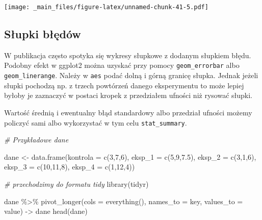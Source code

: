 \documentclass[
]{book}
\newenvironment{Shaded}{\begin{snugshade}}{\end{snugshade}}
\newcommand{\AttributeTok}[1]{\textcolor[rgb]{0.77,0.63,0.00}{#1}}
\newcommand{\CommentTok}[1]{\textcolor[rgb]{0.56,0.35,0.01}{\textit{#1}}}
\newcommand{\DecValTok}[1]{\textcolor[rgb]{0.00,0.00,0.81}{#1}}
\newcommand{\FloatTok}[1]{\textcolor[rgb]{0.00,0.00,0.81}{#1}}
\newcommand{\FunctionTok}[1]{\textcolor[rgb]{0.00,0.00,0.00}{#1}}
\newcommand{\NormalTok}[1]{#1}
\newcommand{\OtherTok}[1]{\textcolor[rgb]{0.56,0.35,0.01}{#1}}
\newcommand{\SpecialCharTok}[1]{\textcolor[rgb]{0.00,0.00,0.00}{#1}}
\newcommand{\StringTok}[1]{\textcolor[rgb]{0.31,0.60,0.02}{#1}}
\begin{document}
\texttt{[image: \_main\_files/figure-latex/unnamed-chunk-41-5.pdf]}

\hypertarget{sux142upki-bux142ux119duxf3w}{%
\subsection{Słupki błędów}\label{sux142upki-bux142ux119duxf3w}}

W publikacja często spotyka się wykresy słupkowe z dodanym słupkiem błędu. Podobny efekt w ggplot2 można uzyskać przy pomocy \texttt{geom\_errorbar} albo \texttt{geom\_linerange}. Należy w \texttt{aes} podać dolną i górną granicę słupka. Jednak jeżeli słupki pochodzą np. z trzech powtórzeń danego eksperymentu to może lepiej byłoby je zaznaczyć w postaci kropek z przedziałem ufności niż rysować słupki.

Wartość średnią i ewentualny błąd standardowy albo przedział ufności możemy policzyć sami albo wykorzystać w tym celu \texttt{stat\_summary}.

\begin{Shaded}
\begin{Highlighting}[]
\CommentTok{\# Przykładowe dane}

\NormalTok{dane }\OtherTok{\textless{}{-}} \FunctionTok{data.frame}\NormalTok{(}\AttributeTok{kontrola =} \FunctionTok{c}\NormalTok{(}\DecValTok{3}\NormalTok{,}\DecValTok{7}\NormalTok{,}\DecValTok{6}\NormalTok{), }\AttributeTok{eksp\_1 =} \FunctionTok{c}\NormalTok{(}\DecValTok{5}\NormalTok{,}\DecValTok{9}\NormalTok{,}\FloatTok{7.5}\NormalTok{), }\AttributeTok{eksp\_2 =} \FunctionTok{c}\NormalTok{(}\DecValTok{3}\NormalTok{,}\DecValTok{1}\NormalTok{,}\DecValTok{6}\NormalTok{), }\AttributeTok{eksp\_3 =} \FunctionTok{c}\NormalTok{(}\DecValTok{10}\NormalTok{,}\DecValTok{11}\NormalTok{,}\DecValTok{8}\NormalTok{), }\AttributeTok{eksp\_4 =} \FunctionTok{c}\NormalTok{(}\DecValTok{1}\NormalTok{,}\DecValTok{12}\NormalTok{,}\DecValTok{4}\NormalTok{))}

\CommentTok{\# przechodzimy do formatu tidy}
\FunctionTok{library}\NormalTok{(tidyr)}

\NormalTok{dane }\SpecialCharTok{\%\textgreater{}\%} \FunctionTok{pivot\_longer}\NormalTok{(}\AttributeTok{cols =} \FunctionTok{everything}\NormalTok{(), }\AttributeTok{names\_to =} \StringTok{\textquotesingle{}key\textquotesingle{}}\NormalTok{, }\AttributeTok{values\_to =} \StringTok{\textquotesingle{}value\textquotesingle{}}\NormalTok{) }\OtherTok{{-}\textgreater{}}\NormalTok{ dane}
\FunctionTok{head}\NormalTok{(dane)}
\end{Highlighting}
\end{Shaded}
\end{document}
